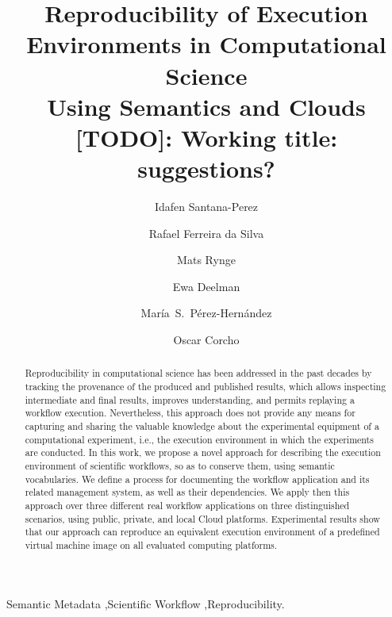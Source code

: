 \documentclass[final,5p,times,twocolumn]{elsarticle}
\newcommand{\note}[2][inline]{\color{red} [TODO]: #2\color{black}}
\begin{document}
\begin{frontmatter}

\title{Reproducibility of Execution Environments in Computational Science\\Using Semantics and Clouds
\\ \small \note{Working title: suggestions?}}

\author[upm]{Idafen Santana-Perez}

\author[isi]{Rafael Ferreira da Silva}

\author[isi]{Mats Rynge}

\author[isi]{Ewa Deelman}

\author[upm]{Mar\'ia~S.~P\'erez-Hern\'andez}

\author[upm]{Oscar Corcho}


\address[upm]{Ontology Engineering Group, Universidad Polit\'ecnica de Madrid, Madrid, Spain }
\address[isi]{University of Southern California, Information Sciences Institute, Marina del Rey, CA, USA}


\begin{abstract}
Reproducibility in computational science has been addressed in the past decades 
by tracking the provenance of the produced and published results, which allows 
inspecting intermediate and final results, improves understanding, and permits 
replaying a workflow execution. Nevertheless, this approach does not provide any 
means for capturing and sharing the valuable knowledge about the experimental 
equipment of a computational experiment, i.e., the execution environment in which 
the experiments are conducted. In this work, we propose a novel approach for 
describing the execution environment of scientific workflows, so as to conserve them, 
using semantic vocabularies. We define a process for documenting the workflow 
application and its related management system, as well as their dependencies. 
We apply then this approach over three different real workflow applications on three 
distinguished scenarios, using public, private, and local Cloud platforms. Experimental 
results show that our approach can reproduce an equivalent execution environment of 
a predefined virtual machine image on all evaluated computing platforms.
\end{abstract}

\begin{keyword}
Semantic Metadata \sep Scientific Workflow \sep Reproducibility.
\end{keyword}


\end{frontmatter}
\end{document}

